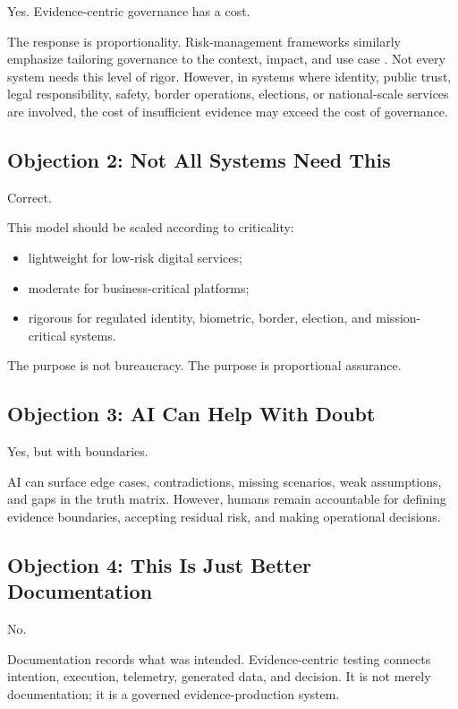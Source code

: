 \documentclass[11pt,a4paper]{article}
\begin{document}
Yes. Evidence-centric governance has a cost.

The response is proportionality. Risk-management frameworks similarly emphasize tailoring governance to the context, impact, and use case \cite{nistai,nistgenai}. Not every system needs this level of rigor. However, in systems where identity, public trust, legal responsibility, safety, border operations, elections, or national-scale services are involved, the cost of insufficient evidence may exceed the cost of governance.

\subsection{Objection 2: Not All Systems Need This}

Correct.

This model should be scaled according to criticality:
\begin{itemize}
\item lightweight for low-risk digital services;
\item moderate for business-critical platforms;
\item rigorous for regulated identity, biometric, border, election, and mission-critical systems.
\end{itemize}

The purpose is not bureaucracy. The purpose is proportional assurance.

\subsection{Objection 3: AI Can Help With Doubt}

Yes, but with boundaries.

AI can surface edge cases, contradictions, missing scenarios, weak assumptions, and gaps in the truth matrix. However, humans remain accountable for defining evidence boundaries, accepting residual risk, and making operational decisions.

\subsection{Objection 4: This Is Just Better Documentation}

No.

Documentation records what was intended. Evidence-centric testing connects intention, execution, telemetry, generated data, and decision. It is not merely documentation; it is a governed evidence-production system.
\end{document}
